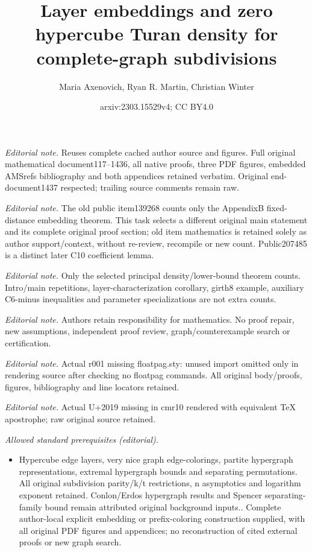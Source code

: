 \documentclass[11pt, a4paper]{article}
\title{Layer embeddings and zero hypercube Turan density for complete-graph subdivisions}
\author{Maria Axenovich, Ryan R. Martin, Christian Winter}
\date{arxiv:2303.15529v4; CC BY4.0}
\begin{document}
\maketitle
\noindent\textit{Editorial note.} Reuses complete cached author source and figures. Full original mathematical document117--1436, all native proofs, three PDF figures, embedded AMSrefs bibliography and both appendices retained verbatim. Original end-document1437 respected; trailing source comments remain raw.\par\medskip
\noindent\textit{Editorial note.} The old public item139268 counts only the AppendixB fixed-distance embedding theorem. This task selects a different original main statement and its complete original proof section; old item mathematics is retained solely as author support/context, without re-review, recompile or new count. Public207485 is a distinct later C10 coefficient lemma.\par\medskip
\noindent\textit{Editorial note.} Only the selected principal density/lower-bound theorem counts. Intro/main repetitions, layer-characterization corollary, girth8 example, auxiliary C6-minus inequalities and parameter specializations are not extra counts.\par\medskip
\noindent\textit{Editorial note.} Authors retain responsibility for mathematics. No proof repair, new assumptions, independent proof review, graph/counterexample search or certification.\par\medskip
\noindent\textit{Editorial note.} Actual r001 missing floatpag.sty: unused import omitted only in rendering source after checking no floatpag commands. All original body/proofs, figures, bibliography and line locators retained.\par\medskip
\noindent\textit{Editorial note.} Actual U+2019 missing in cmr10 rendered with equivalent TeX apostrophe; raw original source retained.\par\medskip
\noindent\textit{Allowed standard prerequisites (editorial).}\begin{itemize}
\item Hypercube edge layers, very nice graph edge-colorings, partite hypergraph representations, extremal hypergraph bounds and separating permutations. All original subdivision parity/k/t restrictions, n asymptotics and logarithm exponent retained. Conlon/Erdos hypergraph results and Spencer separating-family bound remain attributed original background inputs.. Complete author-local explicit embedding or prefix-coloring construction supplied, with all original PDF figures and appendices; no reconstruction of cited external proofs or new graph search.
\end{itemize}\medskip
\end{document}
